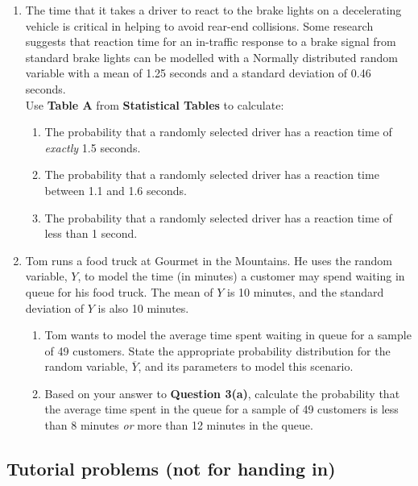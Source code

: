 \documentclass[twoside, 12pt, a4paper]{article}\usepackage[]{graphicx}\usepackage[usenames,dvipsnames]{xcolor}
\begin{document}
\begin{enumerate}
  \item The time that it takes a driver to react to the brake lights on a decelerating vehicle is critical in helping to avoid rear-end collisions. Some research suggests that reaction time for an in-traffic response to a brake signal from standard brake lights can be modelled with a Normally distributed random variable with a mean of 1.25 seconds and a standard deviation of 0.46 seconds. \medskip \\ Use \textbf{Table A} from \textbf{Statistical Tables} to calculate:
  \begin{enumerate}
    \item The probability that a randomly selected driver has a reaction time of \textit{exactly} 1.5 seconds.
    \item The probability that a randomly selected driver has a reaction time between 1.1 and 1.6 seconds.
    \item The probability that a randomly selected driver has a reaction time of less than 1 second.
  \end{enumerate}
  
  \clearpage
  
  \item Tom runs a food truck at Gourmet in the Mountains. He uses the random variable, $Y$, to model the time (in minutes) a customer may spend waiting in queue for his food truck. The mean of $Y$ is 10 minutes, and the standard deviation of $Y$ is also 10 minutes.
  \begin{enumerate}
    \item Tom wants to model the average time spent waiting in queue for a sample of 49 customers. State the appropriate probability distribution for the random variable, $\overline{Y}$, and its parameters to model this scenario.
    \item Based on your answer to \textbf{Question 3(a)}, calculate the probability that the average time spent in the queue for a sample of 49 customers is less than 8 minutes \textit{or} more than 12 minutes in the queue.
  \end{enumerate}
\end{enumerate}

\subsection{Tutorial problems (not for handing in)}
\medskip
\end{document}
